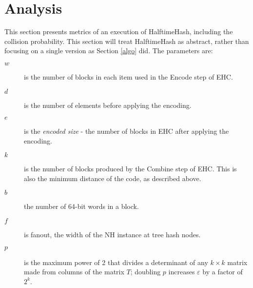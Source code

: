 \documentclass[runningheads]{llncs}
\begin{document}





\section{Analysis}
\label{analysis}

This section presents metrics of an execution of HalftimeHash, including the collision probability.%
This section will treat HalftimeHash as abstract, rather than focusing on a single version as Section \ref{algo} did.
The parameters are:

\begin {description}
\item[$w$] is the number of blocks in each item used in the Encode step of EHC.
\item[$d$] is the number of elements before applying the encoding.
\item[$e$] is the {\em encoded size} - the number of blocks in EHC after applying the encoding.
\item[$k$] is the number of blocks produced by the Combine step of EHC.
  This is also the minimum distance of the code, as described above.
\item[$b$] the number of 64-bit words in a block.
\item[$f$] is fanout, the width of the NH instance at tree hash nodes.
\item[$p$] is the maximum power of 2 that divides a determinant of any $k \times k$ matrix made from columns of the matrix $T$; doubling $p$ increases $\varepsilon$ by a factor of $2^k$.
\end{description}
\end{document}
